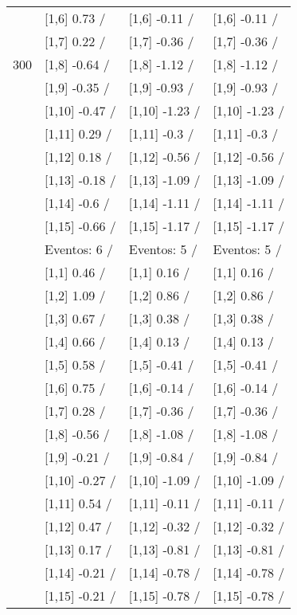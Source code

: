 \begin{table}
\begin{tabular}[t]{llll}
 & {}[1,6] 0.73  / & {}[1,6] -0.11  / & {}[1,6] -0.11  /\\
 & {}[1,7] 0.22  / & {}[1,7] -0.36  / & {}[1,7] -0.36  /\\
300 & {}[1,8] -0.64  / & {}[1,8] -1.12  / & {}[1,8] -1.12  /\\
\addlinespace
 & {}[1,9] -0.35  / & {}[1,9] -0.93  / & {}[1,9] -0.93  /\\
 & {}[1,10] -0.47  / & {}[1,10] -1.23  / & {}[1,10] -1.23  /\\
 & {}[1,11] 0.29  / & {}[1,11] -0.3  / & {}[1,11] -0.3  /\\
 & {}[1,12] 0.18  / & {}[1,12] -0.56  / & {}[1,12] -0.56  /\\
 & {}[1,13] -0.18  / & {}[1,13] -1.09  / & {}[1,13] -1.09  /\\
\addlinespace
 & {}[1,14] -0.6  / & {}[1,14] -1.11  / & {}[1,14] -1.11  /\\
 & {}[1,15] -0.66  / & {}[1,15] -1.17  / & {}[1,15] -1.17  /\\
 & Eventos:  6 / & Eventos:  5 / & Eventos:  5 /\\
 & {}[1,1] 0.46  / & {}[1,1] 0.16  / & {}[1,1] 0.16  /\\
 & {}[1,2] 1.09  / & {}[1,2] 0.86  / & {}[1,2] 0.86  /\\
\addlinespace
 & {}[1,3] 0.67  / & {}[1,3] 0.38  / & {}[1,3] 0.38  /\\
 & {}[1,4] 0.66  / & {}[1,4] 0.13  / & {}[1,4] 0.13  /\\
 & {}[1,5] 0.58  / & {}[1,5] -0.41  / & {}[1,5] -0.41  /\\
 & {}[1,6] 0.75  / & {}[1,6] -0.14  / & {}[1,6] -0.14  /\\
 & {}[1,7] 0.28  / & {}[1,7] -0.36  / & {}[1,7] -0.36  /\\
\addlinespace
500 & {}[1,8] -0.56  / & {}[1,8] -1.08  / & {}[1,8] -1.08  /\\
 & {}[1,9] -0.21  / & {}[1,9] -0.84  / & {}[1,9] -0.84  /\\
 & {}[1,10] -0.27  / & {}[1,10] -1.09  / & {}[1,10] -1.09  /\\
 & {}[1,11] 0.54  / & {}[1,11] -0.11  / & {}[1,11] -0.11  /\\
 & {}[1,12] 0.47  / & {}[1,12] -0.32  / & {}[1,12] -0.32  /\\
\addlinespace
 & {}[1,13] 0.17  / & {}[1,13] -0.81  / & {}[1,13] -0.81  /\\
 & {}[1,14] -0.21  / & {}[1,14] -0.78  / & {}[1,14] -0.78  /\\
 & {}[1,15] -0.21  / & {}[1,15] -0.78  / & {}[1,15] -0.78  /\\
\bottomrule
\end{tabular}
\end{table}
